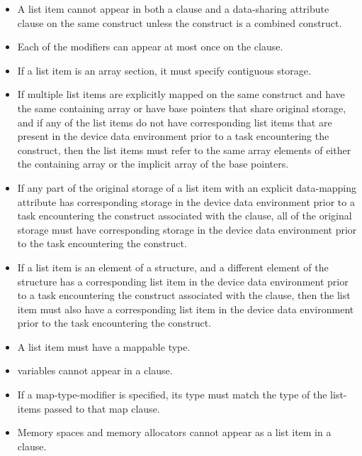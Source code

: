 \begin{itemize}
\item A list item cannot appear in both a  clause and a data-sharing
      attribute clause on the same construct unless the construct is a
      combined construct.
\item Each of the  modifiers can appear at most once on the
       clause.


\item If a list item is an array section, it must specify contiguous storage.
\item If multiple list items are explicitly mapped on the same construct and 
      have the same containing array or have base pointers that share original 
      storage, and if any of the list items do not have corresponding list
      items that are present in the device data environment prior to a task
      encountering the construct, then the list items must refer to the same 
      array elements of either the containing array or the implicit array of 
      the base pointers.
\item If any part of the original storage of a list item with an explicit 
      data-mapping attribute has corresponding storage in the device data
      environment prior to a task encountering the construct associated with the
       clause, all of the original storage must have corresponding storage
      in the device data environment prior to the task encountering the construct.
\item If a list item is an element of a structure, and a different element
      of the structure has a corresponding list item in the device data 
      environment prior to a task encountering the construct associated 
      with the  clause, then the list item must also have a 
      corresponding list item in the device data environment prior to 
      the task encountering the construct.
\item A list item must have a mappable type.
\item {} variables cannot appear in a  clause.
\item If a  map-type-modifier is specified, its type must match 
      the type of the list-items passed to that map clause.
\item Memory spaces and memory allocators cannot appear as a list item in 
      a  clause.


\end{itemize}
